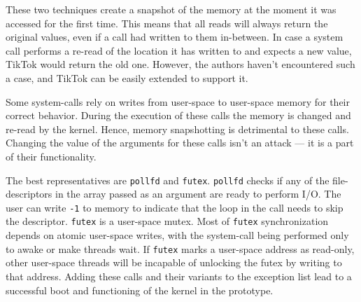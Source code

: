 These two techniques create a snapshot of the memory at the moment it
was accessed for the first time. This means that all reads will always return
the original values, even if a call had written to them in-between. In case a
system call performs a re-read of the location it has written to and expects a
new value, TikTok would return the old one. However, the authors haven't
encountered such a case, and TikTok can be easily extended to support it. 

Some system-calls rely on writes from user-space to user-space memory for their
correct behavior. During the execution of these calls the memory is changed and
re-read by the kernel. Hence, memory snapshotting is detrimental to these calls.
Changing the value of the arguments for these calls isn't an attack --- it is a
part of their functionality.

The best representatives are \texttt{pollfd}\cite{pollfd} and
\texttt{futex}\cite{futex}. \texttt{pollfd} checks if any of the
file-descriptors in the array passed as an argument are ready to perform I/O.
The user can write \texttt{-1} to memory to indicate that the loop in the call
needs to skip the descriptor. \texttt{futex} is a user-space mutex. Most of
\texttt{futex} synchronization depends on atomic user-space writes, with the
system-call being performed only to awake or make threads wait. If
\texttt{futex} marks a user-space address as read-only, other user-space threads
will be incapable of unlocking the futex by writing to that address. Adding
these calls and their variants to the exception list lead to a successful boot
and functioning of the kernel in the prototype.


